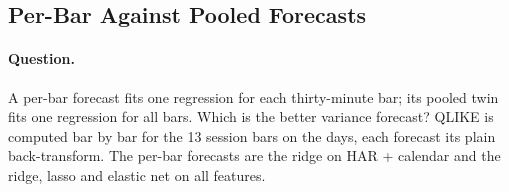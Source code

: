 \subsection{Per-Bar Against Pooled Forecasts}
\label{sec:app_run_perbar}

\paragraph{Question.} A per-bar forecast fits one regression for each
thirty-minute bar; its pooled twin fits one regression for all bars. Which is
the better variance forecast? QLIKE is computed bar by bar for the 13 session
bars on the \runappPbDays{} days, each forecast its plain back-transform. The
per-bar forecasts are the ridge on HAR + calendar and the ridge, lasso and
elastic net on all features.

\begin{table}[H]
\centering
\caption{Per-bar forecast against its pooled twin: the percent difference in
mean QLIKE (negative: the per-bar forecast is better), with the
Diebold--Mariano $t$ of the mean daily loss difference in parentheses, over the
session (each day's mean over the 13 bars) and on three bars labelled by bar
end. Bars better (worse) count the bars whose DM $t$ is below
$-\runappPbDmCrit{}$ (above $\runappPbDmCrit{}$).}
\label{tab:app_run_perbar}
\runappfit{\small}
\end{table}

